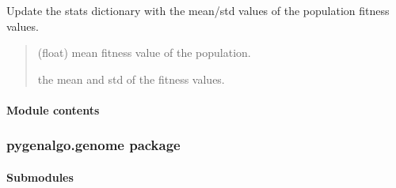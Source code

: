 \documentclass[letterpaper,10pt,english]{sphinxmanual}
\begin{document}
\begin{fulllineitems}
\begin{fulllineitems}
\label{\detokenize{pygenalgo.engines:pygenalgo.engines.standard_ga.StandardGA.update_stats}}
\pysigstartsignatures
\pysiglinewithargsret
{}
{\sphinxparamcomma {}}
{}
\pysigstopsignatures
\sphinxAtStartPar
Update the stats dictionary with the mean/std values of the
population fitness values.
\begin{quote}\begin{description}
\sphinxAtStartPar
{} \textendash{} (float) mean fitness value of the population.

\sphinxAtStartPar
the mean and std of the fitness values.

\end{description}\end{quote}

\end{fulllineitems}


\end{fulllineitems}



\paragraph{Module contents}
\label{\detokenize{pygenalgo.engines:module-pygenalgo.engines}}\label{\detokenize{pygenalgo.engines:module-contents}}
\sphinxstepscope


\subsubsection{pygenalgo.genome package}
\label{\detokenize{pygenalgo.genome:pygenalgo-genome-package}}\label{\detokenize{pygenalgo.genome::doc}}

\paragraph{Submodules}
\label{\detokenize{pygenalgo.genome:submodules}}
\end{document}

